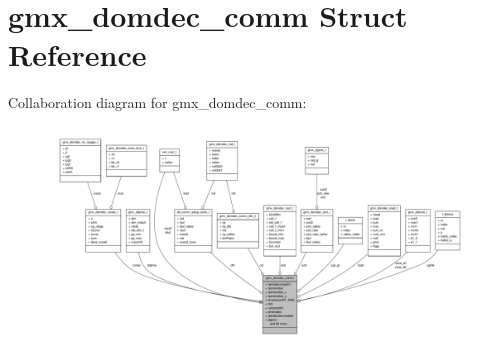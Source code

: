 \hypertarget{structgmx__domdec__comm}{\section{gmx\-\_\-domdec\-\_\-comm \-Struct \-Reference}
\label{structgmx__domdec__comm}
}


\-Collaboration diagram for gmx\-\_\-domdec\-\_\-comm\-:
\nopagebreak
\begin{figure}[H]
\begin{center}
\leavevmode
\includegraphics[width=350pt]{structgmx__domdec__comm__coll__graph}
\end{center}
\end{figure}
